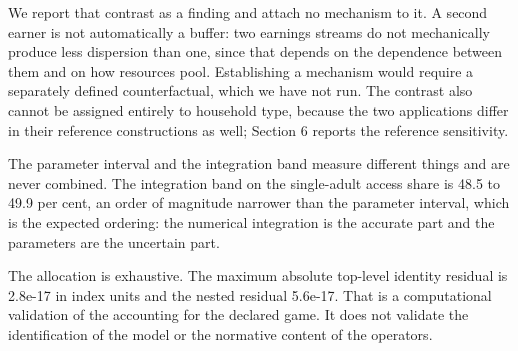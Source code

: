 We report that contrast as a finding and attach no mechanism to it. A second earner is not automatically a buffer: two earnings streams do not mechanically produce less dispersion than one, since that depends on the dependence between them and on how resources pool. Establishing a mechanism would require a separately defined counterfactual, which we have not run. The contrast also cannot be assigned entirely to household type, because the two applications differ in their reference constructions as well; Section 6 reports the reference sensitivity.

The parameter interval and the integration band measure different things and are never combined. The integration band on the single-adult access share is 48.5 to 49.9 per cent, an order of magnitude narrower than the parameter interval, which is the expected ordering: the numerical integration is the accurate part and the parameters are the uncertain part.

The allocation is exhaustive. The maximum absolute top-level identity residual is 2.8e-17 in index units and the nested residual 5.6e-17. That is a computational validation of the accounting for the declared game. It does not validate the identification of the model or the normative content of the operators.

